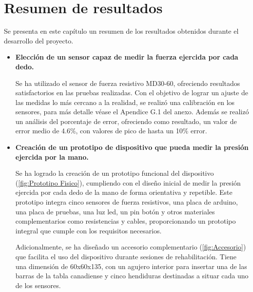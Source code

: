 
\section{Resumen de resultados}

Se presenta en este capítulo un resumen de los resultados obtenidos durante el desarrollo del proyecto. 
\begin{itemize}
    
    \item \textbf{Elección de un sensor capaz de medir la fuerza ejercida por cada dedo.}
    
    Se ha utilizado el sensor de fuerza resistivo MD30-60, ofreciendo resultados satisfactorios en las pruebas realizadas. Con el objetivo de lograr un ajuste de las medidas lo más cercano a la realidad, se realizó una calibración en los sensores, para más detalle véase el Apendice G.1 del anexo. Además se realizó un análisis del porcentaje de error, ofreciendo como resultado, un valor de error medio de 4.6\%, con valores de pico de hasta un 10\% error.
    
    \item \textbf{Creación de un prototipo de dispositivo que pueda medir la presión ejercida por la mano.}
    
    Se ha logrado la creación de un prototipo funcional del dispositivo (\ref{fig:Prototipo Fisico}), cumpliendo con el diseño inicial de medir la presión ejercida por cada dedo de la mano de forma orientativa y repetible. Este prototipo integra cinco sensores de fuerza resistivos, una placa de arduino, una placa de pruebas, una luz led, un pin botón y otros materiales complementarios como resistencias y cables, proporcionando un prototipo integral que cumple con los requisitos necesarios. 

    Adicionalmente, se ha diseñado un accesorio complementario (\ref{fig:Accesorio}) que facilita el uso del dispositivo durante sesiones de rehabilitación. Tiene una dimensión de 60x60x135, con un agujero interior para insertar una de las barras de la
    tabla canadiense y cinco hendiduras destinadas a situar cada uno de los sensores.


\end{itemize}
